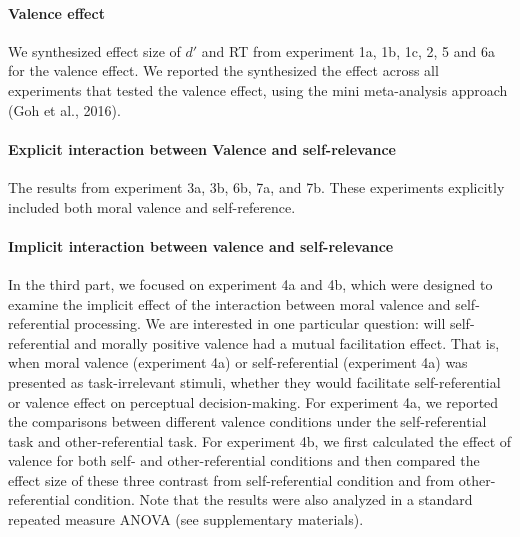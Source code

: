 \documentclass[
  english,
  man]{apa6}
\let\oldparagraph\paragraph
\renewcommand{\paragraph}[1]{\oldparagraph{#1}\mbox{}}
\begin{document}
\hypertarget{valence-effect}{%
\paragraph{Valence effect}\label{valence-effect}}

We synthesized effect size of \(d'\) and RT from experiment 1a, 1b, 1c, 2, 5 and 6a for the valence effect. We reported the synthesized the effect across all experiments that tested the valence effect, using the mini meta-analysis approach (Goh et al., 2016).

\hypertarget{explicit-interaction-between-valence-and-self-relevance}{%
\paragraph{Explicit interaction between Valence and self-relevance}\label{explicit-interaction-between-valence-and-self-relevance}}

The results from experiment 3a, 3b, 6b, 7a, and 7b. These experiments explicitly included both moral valence and self-reference.

\hypertarget{implicit-interaction-between-valence-and-self-relevance}{%
\paragraph{Implicit interaction between valence and self-relevance}\label{implicit-interaction-between-valence-and-self-relevance}}

In the third part, we focused on experiment 4a and 4b, which were designed to examine the implicit effect of the interaction between moral valence and self-referential processing. We are interested in one particular question: will self-referential and morally positive valence had a mutual facilitation effect. That is, when moral valence (experiment 4a) or self-referential (experiment 4a) was presented as task-irrelevant stimuli, whether they would facilitate self-referential or valence effect on perceptual decision-making. For experiment 4a, we reported the comparisons between different valence conditions under the self-referential task and other-referential task. For experiment 4b, we first calculated the effect of valence for both self- and other-referential conditions and then compared the effect size of these three contrast from self-referential condition and from other-referential condition. Note that the results were also analyzed in a standard repeated measure ANOVA (see supplementary materials).
\end{document}
